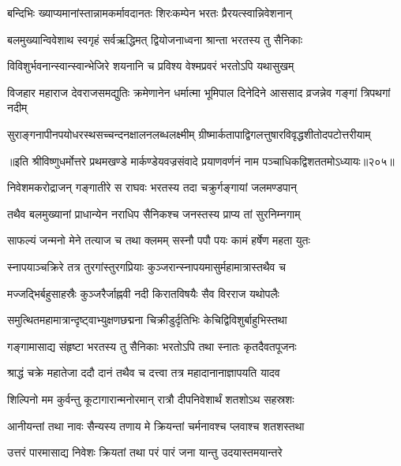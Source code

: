\twolineshloka
{बन्दिभिः ख्याप्यमानांस्तान्नामकर्मावदानतः}
{शिरःकम्पेन भरतः प्रैरयत्स्वान्निवेशनान्}%

\twolineshloka
{बलमुख्यान्विवेशाथ स्वगृहं सर्वऋद्धिमत्}
{द्वियोजनाध्वना श्रान्ता भरतस्य तु सैनिकाः}%

\twolineshloka
{विविशुर्भवनान्स्वान्स्वान्भेजिरे शयनानि च}
{प्रविश्य वेश्मप्रवरं भरतोऽपि यथासुखम्}%


\threelineshloka
{विजहार महाराज देवराजसमद्युतिः}
{क्रमेणानेन धर्मात्मा भूमिपाल दिनेदिने}
{आससाद व्रजन्नेव गङ्गां त्रिपथगां नदीम्}%

\twolineshloka
{सुराङ्गनापीनपयोधरस्थसच्चन्दनक्षालनलब्धलक्ष्मीम्} 
{ग्रीष्मार्कतापाद्विगलत्तुषारविवृद्धशीतोदपटोत्तरीयाम्}%

॥इति श्रीविष्णुधर्मोत्तरे प्रथमखण्डे मार्कण्डेयवज्रसंवादे प्रयाणवर्णनं नाम पञ्चाधिकद्विशततमोऽध्यायः॥२०५॥



\twolineshloka
{निवेशमकरोद्राजन् गङ्गातीरे स राघवः}
{भरतस्य तदा चक्रुर्गङ्गायां जलमण्डपान्}%

\twolineshloka
{तथैव बलमुख्यानां प्राधान्येन नराधिप}
{सैनिकश्च जनस्तस्य प्राप्य तां सुरनिम्नगाम्}%

\twolineshloka
{साफल्यं जन्मनो मेने तत्याज च तथा क्लमम्}
{सस्नौ पपौ पयः कामं हर्षेण महता युतः}%

\twolineshloka
{स्नापयाञ्चक्रिरे तत्र तुरगांस्तुरगप्रियाः}
{कुञ्जरान्स्नापयमासुर्महामात्रास्तथैव च}%

\twolineshloka
{मज्जद्भिर्बहुसाहस्रैः कुञ्जरैर्जाह्नवी नदी}
{किरातविषयैः सैव विरराज यथोपलैः}%

\twolineshloka
{समुत्थितमहामात्रान्दृष्ट्वाभ्युक्षणछद्मना}
{चिक्रीडुर्दृतिभिः केचिद्विविशुर्बाहुभिस्तथा}%

\twolineshloka
{गङ्गामासाद्य संहृष्टा भरतस्य तु सैनिकाः}
{भरतोऽपि तथा स्नातः कृतदैवतपूजनः}%

\twolineshloka
{श्राद्धं चक्रे महातेजा ददौ दानं तथैव च}
{दत्त्वा तत्र महादानानाज्ञापयति यादव}%

\twolineshloka
{शिल्पिनो मम कुर्वन्तु कूटागारान्मनोरमान्}
{रात्रौ दीपनिवेशार्थं शतशोऽथ सहस्रशः}%

\twolineshloka
{आनीयन्तां तथा नावः सैन्यस्य तणाय मे}
{क्रियन्तां चर्मनावश्च प्लवाश्च शतशस्तथा} %

\twolineshloka
{उत्तरं पारमासाद्य निवेशः क्रियतां तथा}
{परं पारं जना यान्तु उदयास्तमयान्तरे}%

